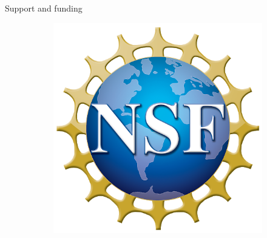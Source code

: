 \documentclass[aspectratio=169]{beamer}
\begin{document}
\begin{frame}{Support and funding}
\begin{figure}
\begin{subfigure}[b]{0.3\textwidth}
         \includegraphics[width=\textwidth]{figures/nsf.png}
     \end{subfigure}
\end{figure}
\end{frame}
\end{document}

